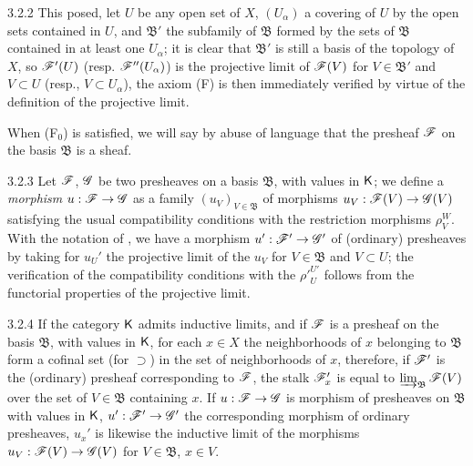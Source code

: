 \begin{env}{3.2.2}
This posed, let $U$ be any open set of $X$, $(U_\alpha)$ a covering of $U$ by
the open sets contained in $U$, and $\mathfrak{B}'$ the subfamily of
$\mathfrak{B}$ formed by the sets
of $\mathfrak{B}$ contained in at least one $U_\alpha$; it is clear that
$\mathfrak{B}'$ is still a basis of the topology of $X$, so $\mathscr{F}'(U)$
(resp. $\mathscr{F}''(U_\alpha)$) is the projective limit of $\mathscr{F}(V)$ for
$V\in\mathfrak{B}'$ and $V\subset U$ (resp., $V\subset U_\alpha$), the axiom (F)
is then immediately verified by virtue of the definition of the projective
limit.

When (F$_0$) is satisfied, we will say by abuse of language that the presheaf
$\mathscr{F}$ on the basis $\mathfrak{B}$ is a sheaf.
\end{env}

\begin{env}{3.2.3}
\label{env-0.3.2.3}
Let $\mathscr{F}$, $\mathscr{G}$ be two presheaves on a basis $\mathfrak{B}$, with values
in $\mathsf{K}$; we define a \emph{morphism} $u:\mathscr{F}\to\mathscr{G}$ as a family
$(u_V)_{V\in\mathfrak{B}}$ of morphisms $u_V:\mathscr{F}(V)\to\mathscr{G}(V)$ satisfying
the usual compatibility conditions with the restriction morphisms $\rho_V^W$.
With the notation of , we have a morphism
$u':\mathscr{F}'\to\mathscr{G}'$ of (ordinary) presheaves by taking for $u_U'$ the
projective limit of the $u_V$ for $V\in\mathfrak{B}$ and $V\subset U$; the
verification of the compatibility conditions with the ${\rho'}_U^{U'}$ follows
from the functorial properties of the projective limit.
\end{env}

\begin{env}{3.2.4}
\label{env-0.3.2.4}
If the category $\mathsf{K}$ admits inductive limits, and if $\mathscr{F}$ is a presheaf on
the basis $\mathfrak{B}$, with values in $\mathsf{K}$, for each $x\in X$ the
neighborhoods of $x$ belonging to $\mathfrak{B}$ form a cofinal set
(for $\supset$) in the set of neighborhoods of $x$, therefore, if $\mathscr{F}'$ is
the (ordinary) presheaf corresponding to $\mathscr{F}$, the stalk $\mathscr{F}_x'$ is
equal to $\varinjlim_{\mathfrak{B}}\mathscr{F}(V)$ over the set of $V\in\mathfrak{B}$
containing $x$. If $u:\mathscr{F}\to\mathscr{G}$ is morphism of presheaves on
$\mathfrak{B}$ with values in $\mathsf{K}$, $u':\mathscr{F}'\to\mathscr{G}'$ the corresponding
morphism of ordinary presheaves, $u_x'$ is likewise the inductive limit of the
morphisms $u_V:\mathscr{F}(V)\to\mathscr{G}(V)$ for $V\in\mathfrak{B}$, $x\in V$.
\end{env}

